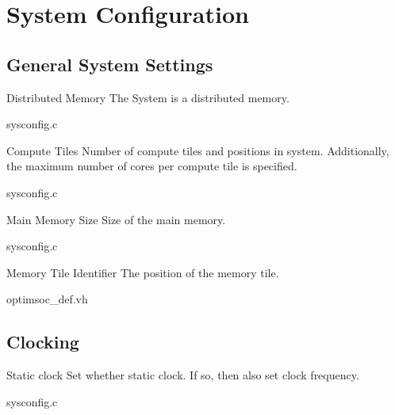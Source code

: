 \chapter{System Configuration}
\label{chap:system-configuration}

\section{General System Settings}

\begin{sysconfigbox}{Distributed Memory}
The System is a distributed memory.
\begin{sysconfigboxref}{sysconfig.c}
\end{sysconfigboxref}
\end{sysconfigbox}

\begin{sysconfigbox}{Compute Tiles}
Number of compute tiles and positions in system. Additionally, the
maximum number of cores per compute tile is specified.
\begin{sysconfigboxref}{sysconfig.c}
\end{sysconfigboxref}
\end{sysconfigbox}

\begin{sysconfigbox}{Main Memory Size}
Size of the main memory.
\begin{sysconfigboxref}{sysconfig.c}
\end{sysconfigboxref}
\end{sysconfigbox}

\begin{sysconfigbox}{Memory Tile Identifier}
The position of the memory tile.
\begin{sysconfigboxref}{optimsoc\_def.vh}
\end{sysconfigboxref}
\end{sysconfigbox}

\section{Clocking}

\begin{sysconfigbox}{Static clock}
Set whether static clock. If so, then also set clock frequency.
\begin{sysconfigboxref}{sysconfig.c}
\end{sysconfigboxref}
\end{sysconfigbox}

